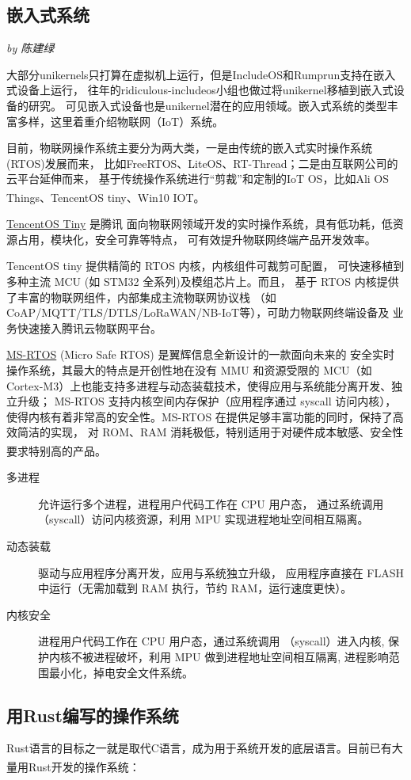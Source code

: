 \documentclass[UTF8,fontset=none,linespread=1.15]{ctexart}
\let\nosupcite\cite
\renewcommand*{\cite}[1]{\textsuperscript{\nosupcite{#1}}}
\newcommand{\sectionauthor}[1]{%
\vspace*{-5ex}
\noindent\textrm{\hfill\textit{by #1}}
\vspace*{2ex}\par}
\begin{document}
\subsection{嵌入式系统}\sectionauthor{陈建绿}
大部分unikernels只打算在虚拟机上运行，但是IncludeOS和Rumprun支持在嵌入式设备上运行，
往年的ridiculous-includeos小组也做过将unikernel移植到嵌入式设备的研究。
可见嵌入式设备也是unikernel潜在的应用领域。嵌入式系统的类型丰富多样，这里着重介绍物联网（IoT）系统。

目前，物联网操作系统主要分为两大类，一是由传统的嵌入式实时操作系统(RTOS)发展而来，
比如FreeRTOS、LiteOS、RT-Thread；二是由互联网公司的云平台延伸而来，
基于传统操作系统进行“剪裁”和定制的IoT OS，比如Ali OS Things、TencentOS tiny、Win10 IOT。\cite{bib:iot-sys}

\href{https://github.com/OpenAtomFoundation/TencentOS-tiny}{TencentOS Tiny} 是腾讯
面向物联网领域开发的实时操作系统，具有低功耗，低资源占用，模块化，安全可靠等特点，
可有效提升物联网终端产品开发效率。

TencentOS tiny 提供精简的 RTOS 内核，内核组件可裁剪可配置，
可快速移植到多种主流 MCU (如 STM32 全系列)及模组芯片上。而且，
基于 RTOS 内核提供了丰富的物联网组件，内部集成主流物联网协议栈
（如CoAP/MQTT/TLS/DTLS/LoRaWAN/NB-IoT等），可助力物联网终端设备及
业务快速接入腾讯云物联网平台。

\href{https://github.com/ms-rtos}{MS-RTOS} (Micro Safe RTOS) 是翼辉信息全新设计的一款面向未来的
安全实时操作系统，其最大的特点是开创性地在没有 MMU 和资源受限的 MCU（如Cortex-M3）上也能支持多进程与动态装载技术，使得应用与系统能分离开发、独立升级；
MS-RTOS 支持内核空间内存保护（应用程序通过 syscall 访问内核），
使得内核有着非常高的安全性。MS-RTOS 在提供足够丰富功能的同时，保持了高效简洁的实现，
对 ROM、RAM 消耗极低，特别适用于对硬件成本敏感、安全性要求特别高的产品。\cite{bib:ms-rtos}

\begin{description}
\item[多进程] 允许运行多个进程，进程用户代码工作在 CPU 用户态，
通过系统调用（syscall）访问内核资源，利用 MPU 实现进程地址空间相互隔离。
\item[动态装载] 驱动与应用程序分离开发，应用与系统独立升级，
应用程序直接在 FLASH 中运行（无需加载到 RAM 执行，节约 RAM，运行速度更快）。
\item[内核安全] 进程用户代码工作在 CPU 用户态，通过系统调用
（syscall）进入内核, 保护内核不被进程破坏，利用 MPU 做到进程地址空间相互隔离,
进程影响范围最小化，掉电安全文件系统。
\end{description}
\subsection{用Rust编写的操作系统}
Rust语言的目标之一就是取代C语言，成为用于系统开发的底层语言。目前已有大量用Rust开发的操作系统：\cite{bib:rust-os-comparison}
\end{document}
